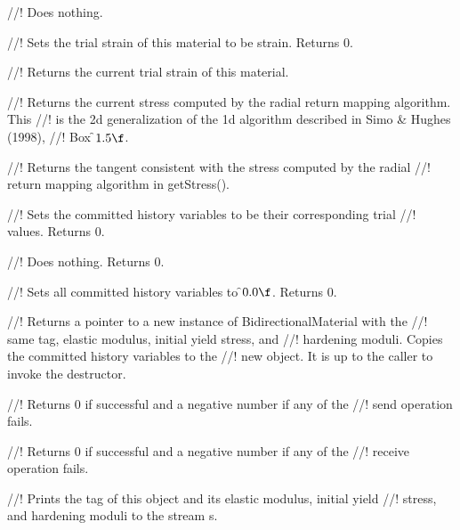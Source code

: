 //! Does nothing.

//! Sets the trial strain of this material to be \p strain. Returns 0.

//! Returns the current trial strain of this material.

//! Returns the current stress computed by the radial return mapping algorithm. This
//! is the 2d generalization of the 1d algorithm described in Simo \& Hughes (1998),
//! Box \f$1.5\f$.

//! Returns the tangent consistent with the stress computed by the radial
//! return mapping algorithm in getStress().

//! Sets the committed history variables to be their corresponding trial
//! values. Returns 0.

//! Does nothing. Returns 0.

//! Sets all committed history variables to \f$0.0\f$. Returns 0.

//! Returns a pointer to a new instance of BidirectionalMaterial with the 
//! same tag, elastic modulus, initial yield stress, and 
//! hardening moduli. Copies the committed history variables to the 
//! new object. It is up to the caller to invoke the destructor.

//! Returns 0 if successful and a negative number if any of the 
//! send operation fails.

//! Returns 0 if successful and a negative number if any of the 
//! receive operation fails.

//! Prints the tag of this object and its elastic modulus, initial yield
//! stress, and hardening moduli to the stream \p s.
